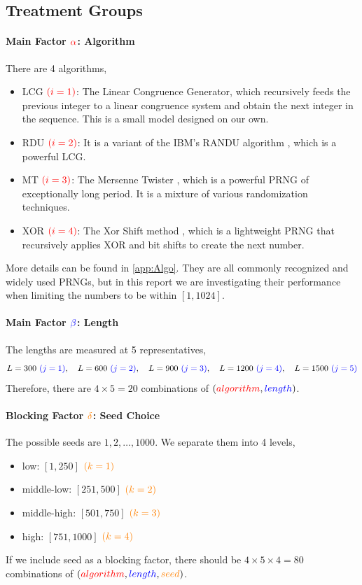 \documentclass{report}
\begin{document}
\subsection{Treatment Groups}
\paragraph{Main Factor $\color{red}\alpha$: Algorithm} There are 4 algorithms,
\begin{itemize}
    \item LCG $\color{red}(i=1)$: The Linear Congruence Generator, which recursively feeds the previous integer to a linear congruence system and obtain the next integer in the sequence. This is a small model designed on our own.
    \item RDU $\color{red}(i=2)$: It is a variant of the IBM's RANDU algorithm \parencite{RandU}, which is a powerful LCG.
    \item MT $\color{red}(i=3)$: The Mersenne Twister \parencite{MT}, which is a powerful PRNG of exceptionally long period. It is a mixture of various randomization techniques.
    \item XOR $\color{red}(i=4)$: The Xor Shift method \parencite{XOR}, which is a lightweight PRNG that recursively applies XOR and bit shifts to create the next number.
\end{itemize}

More details can be found in \eqref{app:Algo}. They are all commonly recognized and widely used PRNGs, but in this report we are investigating their performance when limiting the numbers to be within $[1,1024]$.

\paragraph{Main Factor $\color{blue}\beta$: Length} The lengths are measured at 5 representatives,
\[L=300 \ \mathcolor{blue}{(j=1)}, \quad L=600 \ \mathcolor{blue}{(j=2)}, \quad L=900 \ \mathcolor{blue}{(j=3)},\quad L=1200 \ \mathcolor{blue}{(j=4)},\quad L=1500 \ \mathcolor{blue}{(j=5)}\]
Therefore, there are $4\times 5=20$ combinations of $(\mathcolor{red}{algorithm}, \mathcolor{blue}{length})$.
\paragraph{Blocking Factor $\mathcolor{orange}{\delta}$: Seed Choice} The possible seeds are $1,2,\dots,1000$. We separate them into 4 levels,
\begin{itemize}
    \item low: $[1,250]$ $\mathcolor{orange}{(k=1)}$
    \item middle-low: $[251,500]$ $\mathcolor{orange}{(k=2)}$
    \item middle-high: $[501,750]$  $\mathcolor{orange}{(k=3)}$
    \item high: $[751,1000]$  $\mathcolor{orange}{(k=4)}$
\end{itemize}
If we include seed as a blocking factor, there should be $4\times5\times4=80$ combinations of $(\mathcolor{red}{algorithm}, \mathcolor{blue}{length}, \mathcolor{orange}{seed})$.
\end{document}
